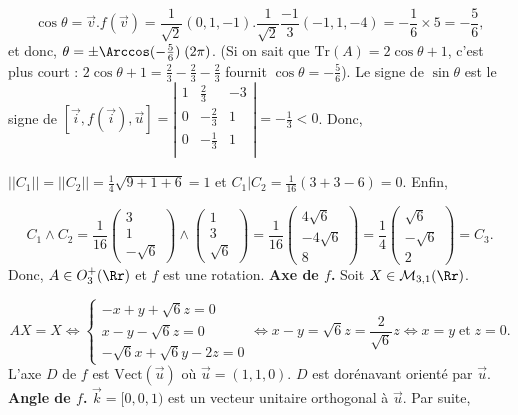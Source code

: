 {{$$\cos\theta=\overrightarrow{v}.f(\overrightarrow{v})=\frac{1}{\sqrt{2}}(0,1,-1).\frac{1}{\sqrt{2}}\frac{-1}{3}(-1,1,-4)=-\frac{1}{6}\times5
=-\frac{5}{6},$$
et donc, $\theta=\pm\Arccos(-\frac{5}{6})\;(2\pi)$. (Si on sait que $\text{Tr}(A)=2\cos\theta+1$, c'est plus court : $2\cos\theta+1=\frac{2}{3}-\frac{2}{3}-\frac{2}{3}$ fournit $\cos\theta=-\frac{5}{6}$).
Le signe de $\sin\theta$ est le signe de $[\overrightarrow{i},f(\overrightarrow{i}),\overrightarrow{u}]=\left|
\begin{array}{ccc}
1&\frac{2}{3}&-3\\
0&-\frac{2}{3}&1\\
0&-\frac{1}{3}&1\\
\end{array}
\right|=-\frac{1}{3}<0$. Donc, 

\begin{center}
\end{center}
$||C_1||=||C_2||=\frac{1}{4}\sqrt{9+1+6}=1$ et $C_1|C_2=\frac{1}{16}(3+3-6)=0$. Enfin, 

$$C_1\wedge C_2=\frac{1}{16}\left(
\begin{array}{c}
3\\
1\\
-\sqrt{6}
\end{array}
\right)\wedge\left(
\begin{array}{c}
1\\
3\\
\sqrt{6}
\end{array}
\right)
=\frac{1}{16}\left(
\begin{array}{c}
4\sqrt{6}\\
-4\sqrt{6}\\
8
\end{array}
\right)=\frac{1}{4}\left(
\begin{array}{c}
\sqrt{6}\\
-\sqrt{6}\\
2
\end{array}
\right)
=C_3.$$
Donc, $A\in O_3^+(\Rr)$ et $f$ est une rotation.
\textbf{Axe de $f$.} Soit $X\in\mathcal{M}_{3,1}(\Rr)$.

$$AX=X\Leftrightarrow\left\{
\begin{array}{l}
-x+y+\sqrt{6}z=0\\
x-y-\sqrt{6}z=0\\
-\sqrt{6}x+\sqrt{6}y-2z=0
\end{array}
\right.\Leftrightarrow x-y=\sqrt{6}z=\frac{2}{\sqrt{6}}z\Leftrightarrow x=y\;\mbox{et}\;z=0.$$ 
L'axe $D$ de $f$ est $\mbox{Vect}(\overrightarrow{u})$ où $\overrightarrow{u}=(1,1,0)$. $D$ est dorénavant orienté par $\overrightarrow{u}$.
\textbf{Angle de $f$.} $\overrightarrow{k}=[0,0,1)$ est un vecteur unitaire orthogonal à $\overrightarrow{u}$. Par suite,

}}
